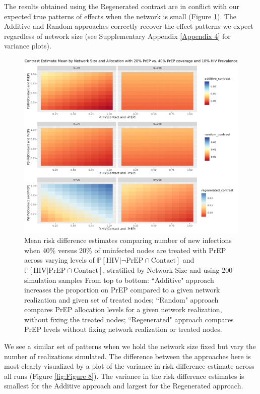 \documentclass{article}
\theoremstyle{definition}
\begin{document}
The results obtained using the Regenerated contrast are in conflict with our expected true patterns of effects when the network is small (Figure \ref{fig:Figure 7}). The Additive and Random approaches correctly recover the effect patterns we expect regardless of network size (see Supplementary Appendix \ref{Appendix 4} for variance plots). 


\begin{figure}[H]
    \centering
    \includegraphics[width=\linewidth]{Corrected Figures/Network Size Mean Plot.png}
    \caption{Mean risk difference estimates comparing number of new infections when 40\% versus 20\% of uninfected nodes are treated with PrEP across varying levels of $\mathbb{P}\left[\text{HIV} \vert \neg \text{PrEP} \cap \text{Contact}\right]$ and $\mathbb{P}\left[\text{HIV} \vert \text{PrEP} \cap \text{Contact}\right]$, stratified by Network Size and using 200 simulation samples 
    From top to bottom: ``Additive" approach increases the proportion on PrEP compared to a given network realization and given set of treated nodes; ``Random" approach compares PrEP allocation levels for a given network realization, without fixing the treated nodes; ``Regenerated" approach compares PrEP levels without fixing network realization or treated nodes. }
    \label{fig:Figure 7}
\end{figure}

We see a similar set of patterns when we hold the network size fixed but vary the number of realizations simulated. The difference between the approaches here is most clearly visualized by a plot of the variance in risk difference estimate across all runs (Figure \ref{fig:Figure 8}). The variance in the risk difference estimates is smallest for the Additive approach and largest for the Regenerated approach. 
\end{document}
